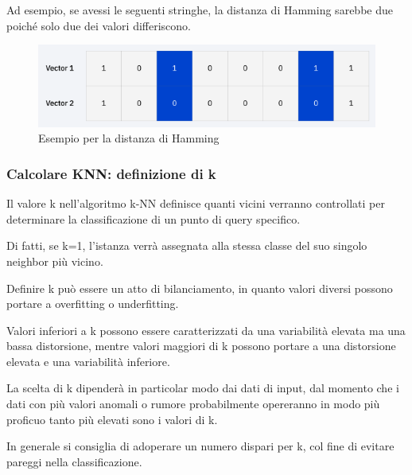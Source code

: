 Ad esempio, se avessi le seguenti stringhe, la distanza di Hamming sarebbe due poiché solo due dei valori differiscono.
\begin{center}    
    \begin{figure}
        \centering
        \includegraphics[width=0.8\linewidth]{images/image16.png}
        \caption{Esempio per la distanza di Hamming}
    \end{figure}
\end{center}


\subsubsection{Calcolare KNN: definizione di k}
Il valore k nell'algoritmo k-NN definisce quanti vicini verranno controllati per determinare la classificazione di un punto di query specifico. 

Di fatti, se k=1, l'istanza verrà assegnata alla stessa classe del suo singolo neighbor più vicino. 

Definire k può essere un atto di bilanciamento, in quanto valori diversi possono portare a overfitting o underfitting. 

Valori inferiori a k possono essere caratterizzati da una variabilità elevata ma una bassa distorsione, mentre valori maggiori di k possono portare a una distorsione elevata e una variabilità inferiore. 

La scelta di k dipenderà in particolar modo dai dati di input, dal momento che i dati con più valori anomali o rumore probabilmente opereranno in modo più proficuo tanto più elevati sono i valori di k. 

In generale si consiglia di adoperare un numero dispari per k, col fine di evitare pareggi nella classificazione.

